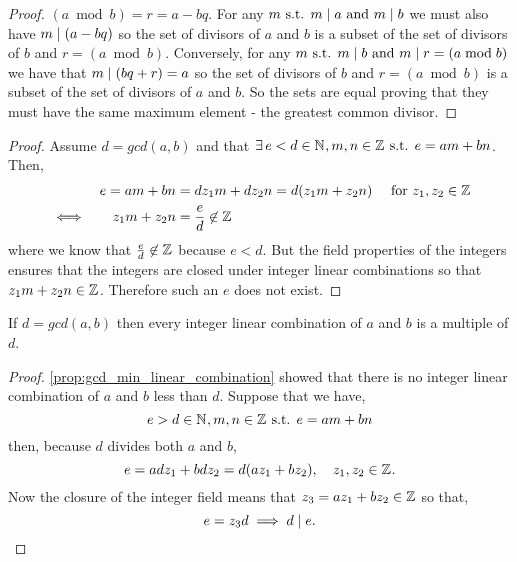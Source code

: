 \documentclass[MathsNotesBase.tex]{subfiles}
\begin{document}
{			
				\begin{proof}
				$(a \bmod b) = r = a - bq$. For any $m \text{ s.t. } m \mid a \text{ and } m \mid b$ we must also have $m \mid (a - bq)$ so the set of divisors of $a$ and $b$ is a subset of the set of divisors of $b$ and $r = (a \bmod b)$. Conversely, for any $m \text{ s.t. } m \mid b \text{ and } m \mid r = (a \bmod b)$ we have that $m \mid (bq + r) = a$ so the set of divisors of $b$ and $r = (a \bmod b)$ is a subset of the set of divisors of $a$ and $b$. So the sets are equal proving that they must have the same maximum element - the greatest common divisor.
				\end{proof}
			
			\begin{proof}
				Assume $d = gcd(a,b)$ and that ${ \exists\, e < d \in \mathbb{N}^{}, m,n \in \mathbb{Z}^{} \text{ s.t. } e = am + bn }$. Then,
				\begin{align*}
					&&e = am + bn &= dz_1m + dz_2n = d(z_1m + z_2n) \hspace{10pt} \text{ for } z_1, z_2 \in \mathbb{Z}^{} \\
					&\iff &z_1m + z_2n &= \frac{e}{d} \not\in \mathbb{Z}^{}
				\end{align*}
				where we know that ${ \frac{e}{d} \not\in \mathbb{Z}^{} }$ because ${ e < d }$. But the field properties of the integers ensures that the integers are closed under integer linear combinations so that $z_1m + z_2n \in \mathbb{Z}^{}$. Therefore such an $e$ does not exist.
			\end{proof}
		
			\begin{corollary}
				\label{coro:integer_linear_combination_is_multiple_of_gcd}
				If $d = gcd(a, b)$ then every integer linear combination of $a$ and $b$ is a multiple of $d$.
			\end{corollary}
			\begin{proof}
				\autoref{prop:gcd_min_linear_combination} showed that there is no integer linear combination of $a$ and $b$ less than $d$. Suppose that we have,
				\[ e > d  \in \mathbb{N}^{}, m,n \in \mathbb{Z}^{} \text{ s.t. } e = am + bn \]
				then, because $d$ divides both $a$ and $b$,
				\[ e = adz_1 + bdz_2 = d(az_1 + bz_2), \hspace{10pt} z_1,z_2 \in \mathbb{Z}^{}. \]
				Now the closure of the integer field means that ${ z_3 = az_1 + bz_2 \in \mathbb{Z}^{} }$ so that,
				\[ e = z_3d \implies d \mid e. \]
			\end{proof}
		
}
\end{document}

